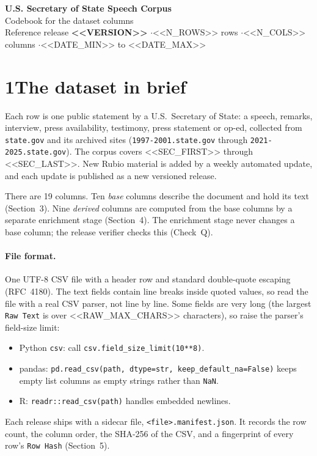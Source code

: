 \documentclass[10pt]{article}
\newcommand{\col}[1]{\texttt{#1}}
\begin{document}
\begin{center}
{\LARGE\bfseries U.S. Secretary of State Speech Corpus}\\[0.4em]
{\Large Codebook for the dataset columns}\\[0.6em]
{\normalsize Reference release \textbf{<<VERSION>>} \quad$\cdot$\quad <<N_ROWS>> rows \quad$\cdot$\quad <<N_COLS>> columns \quad$\cdot$\quad <<DATE_MIN>> to <<DATE_MAX>>}
\end{center}

\section*{1\quad The dataset in brief}

Each row is one public statement by a U.S.\ Secretary of State: a speech,
remarks, interview, press availability, testimony, press statement or op-ed,
collected from \texttt{state.gov} and its archived sites
(\texttt{1997-2001.state.gov} through \texttt{2021-2025.state.gov}).
The corpus covers <<SEC_FIRST>> through <<SEC_LAST>>. New Rubio material is added by a weekly
automated update, and each update is published as a new versioned release.

There are 19 columns. Ten \emph{base} columns describe the document and hold its
text (Section~3). Nine \emph{derived} columns are computed from the base columns by a
separate enrichment stage (Section~4). The enrichment stage never changes a base
column; the release verifier checks this (Check~Q).

\paragraph{File format.} One UTF-8 CSV file with a header row and standard
double-quote escaping (RFC~4180). The text fields contain line breaks inside
quoted values, so read the file with a real CSV parser, not line by line. Some
fields are very long (the largest \col{Raw Text} is over <<RAW_MAX_CHARS>> characters), so
raise the parser's field-size limit:
\begin{itemize}
\item Python \texttt{csv}: call \texttt{csv.field\_size\_limit(10**8)}.
\item pandas: \texttt{pd.read\_csv(path, dtype=str, keep\_default\_na=False)} keeps
empty list columns as empty strings rather than \texttt{NaN}.
\item R: \texttt{readr::read\_csv(path)} handles embedded newlines.
\end{itemize}
Each release ships with a sidecar file, \texttt{<file>.manifest.json}. It records
the row count, the column order, the SHA-256 of the CSV, and a fingerprint of every
row's \col{Row Hash} (Section~5).
\end{document}
